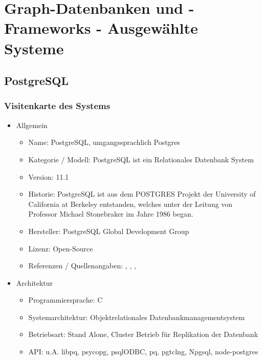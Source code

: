 \chapter{Graph-Datenbanken und -Frameworks - Ausgewählte Systeme }
\section{PostgreSQL}
\subsection{Visitenkarte des Systems}
    \begin{itemize}
        \item Allgemein
        \begin{itemize}
            \item Name: PostgreSQL, umgangssprachlich Postgres
            \item Kategorie / Modell: PostgreSQL ist ein Relationales Datenbank System
            \item Version: 11.1
            \item Historie: PostgreSQL ist aus dem POSTGRES Projekt der University of California at Berkeley entstanden, welches unter der Leitung von  Professor Michael Stonebraker im Jahre 1986 began.
            \item Hersteller: PostgreSQL Global Development Group
            \item Lizenz: Open-Source
            \item Referenzen / Quellenangaben: \cite{froehlich01}, \cite{postgres2018}, \cite{postgresqldoc}, \cite{eisentraut01}
        \end{itemize}
        \item Architektur
        \begin{itemize}
            \item Programmiersprache: C
            \item Systemarchitektur: Objektrelationales Datenbankmanagementsystem
            \item Betriebsart: Stand Alone, Cluster Betrieb für Replikation der Datenbank
            \item API: u.A. libpq, psycopg, psqlODBC, pq, pgtclng, Npgsql, node-postgres
        \end{itemize}
        \newpage

\end{itemize}
